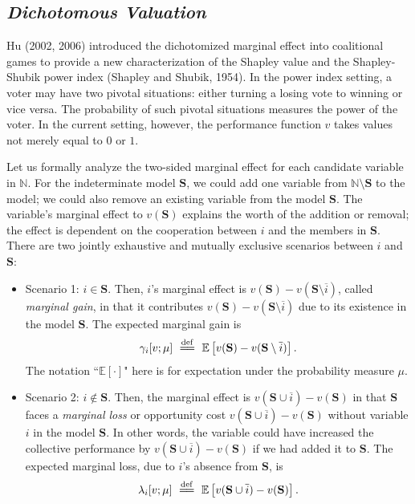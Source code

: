 \documentclass[a4paper,12pt]{article}
\newcommand{\eqdef}{\overset{\mathrm{def}}{=\joinrel=}}
\begin{document}
\subsection{\textit{Dichotomous Valuation}}
\noindent
Hu (2002, 2006) introduced the dichotomized marginal effect into coalitional games to provide a new characterization of the Shapley value and the Shapley-Shubik power index (Shapley and Shubik, 1954).
In the power index setting, a voter may have two pivotal situations: either turning a losing vote to winning or vice versa. 
The probability of such pivotal situations measures the power of the voter. 
In the current setting, however, the performance function $v$ takes values not merely equal to $0$ or $1$.

Let us formally analyze the two-sided marginal effect for each candidate variable in $\mathbb{N}$.
For the indeterminate model $\mathbf{S}$, we could add one variable from $\mathbb{N}\setminus \mathbf{S}$ to the model; we could also remove an existing variable from the model $\mathbf{S}$. 
The variable's marginal effect to $v(\mathbf{S})$ explains the worth of the addition or removal; the effect is dependent on the cooperation between $i$ and the members in $\mathbf{S}$.
There are two jointly exhaustive and mutually exclusive scenarios between $i$ and $\mathbf{S}$:

\begin{center}
\begin{minipage}{5.8in}
\begin{itemize}\itemsep2pt
\item Scenario 1: $i \in {\mathbf S}$. Then,
$i$'s marginal effect is $v({\mathbf S}) - v( {\mathbf S} \setminus \overline{i})$, called \textit{marginal gain}, in that
it contributes $v({\mathbf S}) - v( {\mathbf S} \setminus \overline{i})$ 
due to its existence in the model ${\mathbf S}$. 
The expected marginal gain is 
\begin{equation}\label{eq:gamma}
\gamma_i[v;\mu] \
\eqdef \ \mathbb{E} \left [v({\mathbf S}) - v({\mathbf S} \setminus \overline{i}) \right ].
\end{equation}
The notation ``$\mathbb{E}[\cdot]$" here is for expectation under the probability measure $\mu$.

\item 
Scenario 2: $i \not \in {\mathbf S}$. Then, the marginal effect is
$v({\mathbf S}\cup \overline{i}) - v({\mathbf S})$ in that ${\mathbf S}$ faces a \textit{marginal loss} or opportunity cost
$v({\mathbf S}\cup \overline{i}) - v({\mathbf S})$ without variable $i$ in the model ${\mathbf S}$. 
In other words, the variable could have increased the collective performance by $v({\mathbf S}\cup \overline{i} ) - v({\mathbf S})$ if we had added
it to $\mathbf{S}$. The expected marginal loss, due to $i$'s absence from ${\mathbf S}$, is 
\begin{equation}\label{eq:lambda}
\lambda_i[v;\mu] \
\eqdef \ \mathbb{E} \left [v({\mathbf S}\cup \overline{i}) - v({\mathbf S}) \right ].
\end{equation}
\end{itemize}
\end{minipage}
\end{center}
\end{document}
